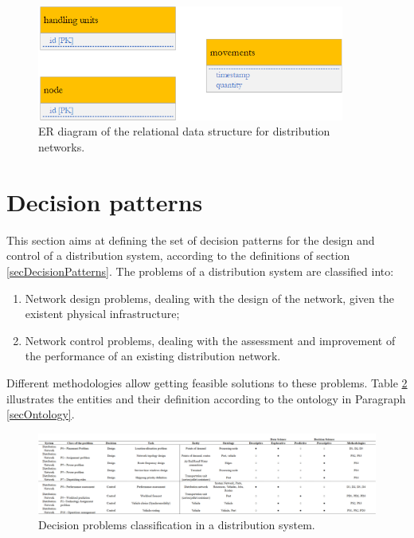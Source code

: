 \begin{figure}[hbt!]
\centering
\includegraphics[width=0.9\textwidth]{SectionDistribution/diagnosticModels_figures/fig_MVM_dist.png}
\captionsetup{type=figure}
\caption{ER diagram of the relational data structure for distribution networks.}
\label{fig_MVM_dist}
\end{figure}


\section{Decision patterns} \label{secDecisionPatternsDistribution}
This section aims at defining the set of decision patterns for the design and control of a distribution system, according to the definitions of section \ref{secDecisionPatterns}. The problems of a distribution system are classified into:

\begin{enumerate}
    \item Network design problems, dealing with the design of the network, given the existent physical infrastructure;
    \item Network control problems, dealing with the assessment and improvement of the performance of an existing distribution network.
\end{enumerate}

Different methodologies allow getting feasible solutions to these problems. Table \ref{tab_problems_dist} illustrates the entities and their definition according to the ontology in Paragraph \ref{secOntology}. 

\begin{landscape}
\thispagestyle{empty}
\begin{figure}[hbt!]
\centering
\includegraphics[width=1.5\textwidth]{SectionDistribution/diagnosticModels_figures/tab_problems_dist.png}
\captionsetup{type=table}
\caption{Decision problems classification in a distribution system.}
\label{tab_problems_dist}
\end{figure}
\end{landscape}

